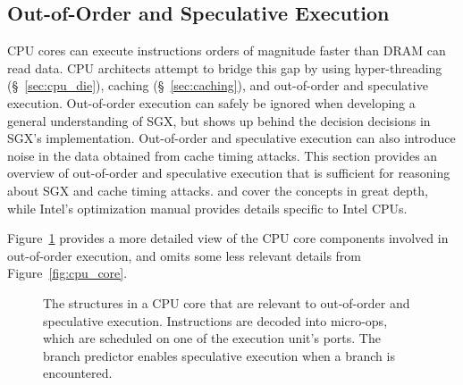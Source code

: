 \subsection{Out-of-Order and Speculative Execution}
\label{sec:out_of_order}

CPU cores can execute instructions orders of magnitude faster than DRAM can
read data. CPU architects attempt to bridge this gap by using hyper-threading
(\S~\ref{sec:cpu_die}), caching (\S~\ref{sec:caching}), and out-of-order and
speculative execution. Out-of-order execution can safely be ignored when
developing a general understanding of SGX, but shows up behind the decision
decisions in SGX's implementation. Out-of-order and speculative execution can
also introduce noise in the data obtained from cache timing attacks. This
section provides an overview of out-of-order and speculative execution that is
sufficient for reasoning about SGX and cache timing attacks.
\cite{patterson2013architecture} and \cite{hennessy2012architecture} cover the
concepts in great depth, while Intel's optimization manual
\cite{intel2014optimization} provides details specific to Intel CPUs.


Figure~\ref{fig:cpu_out_of_order} provides a more detailed view of the CPU core
components involved in out-of-order execution, and omits some less relevant
details from Figure~\ref{fig:cpu_core}.

\begin{figure}[hbt]
  \caption{
    The structures in a CPU core that are relevant to out-of-order and
    speculative execution. Instructions are decoded into micro-ops, which are
    scheduled on one of the execution unit's ports. The branch predictor
    enables speculative execution when a branch is encountered.
  }
  \label{fig:cpu_out_of_order}
\end{figure}

